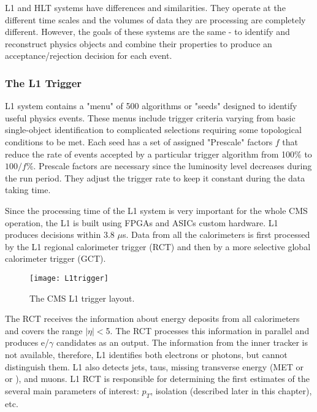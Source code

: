 \begin{normalsize}
L1 and HLT systems have differences and similarities. They operate at the different time scales and the volumes of data they are processing are completely different. However, the goals of these systems are the same - to identify and reconstruct physics objects and combine their properties to produce an acceptance/rejection decision for each event. 



\subsubsection{The L1 Trigger}


L1 system \cite{CMS_TDR} contains a "menu" of 500 algorithms or "seeds" designed to identify useful physics events. These menus include trigger criteria varying from basic single-object identification to complicated selections requiring some topological conditions to be met. Each seed has a set of assigned "Prescale" factors $f$ that reduce the rate of events accepted by a particular trigger algorithm from 100$\%$ to $100/f\%$. Prescale factors are necessary since the luminosity level decreases during the run period. They adjust the trigger rate to keep it constant during the data taking time. 

Since the processing time of the L1 system is very important for the whole CMS operation, the L1 is built using FPGAs and ASICs custom hardware. L1 produces decisions within 3.8 $\mu$s. Data from all the calorimeters is first processed by the L1 regional calorimeter trigger (RCT) and then by a more selective global calorimeter trigger (GCT). 

 \begin{figure}[H]
  \centering
  \texttt{[image: L1trigger]}
  \caption[The CMS L1 trigger layout]{The CMS L1 trigger layout.}
  \label{L1trigger}
\end{figure}

The RCT receives the information about energy deposits from all calorimeters and covers the range $|\eta|<$5. The RCT processes this information in parallel and produces e/$\gamma$ candidates as an output. The information from the inner tracker is not available, therefore, L1 identifies both electrons or photons, but cannot distinguish them. L1 also detects jets, taus, missing transverse energy (MET or \ETslash or \PTslash), and muons. L1 RCT is responsible for determining the first estimates of the several main parameters of interest: $p_T$, isolation (described later in this chapter), etc. 


\end{normalsize}
